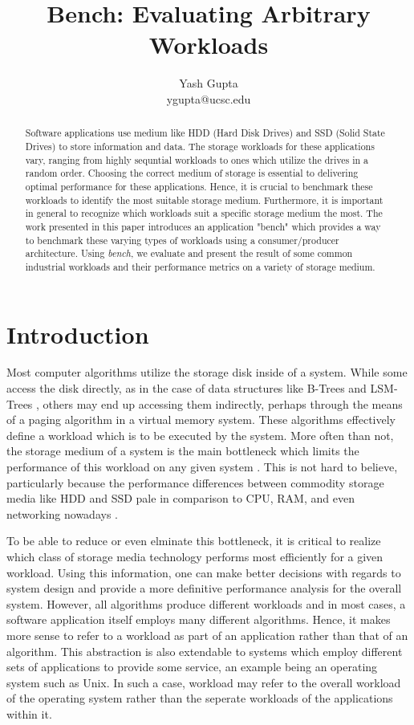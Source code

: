 \documentclass[10pt, author, twocolumn]{article}
\title{\vspace{-0ex}Bench: Evaluating Arbitrary Workloads}
\author{Yash Gupta \\
ygupta@ucsc.edu}
\date{\vspace{-3ex}}
\begin{document}
\maketitle
	
\begin{abstract}
Software applications use medium like HDD (Hard Disk Drives) and SSD (Solid State Drives) to store information and data. The storage workloads for these applications vary, ranging from highly sequntial workloads to ones which utilize the drives in a random order. Choosing the correct medium of storage is essential to delivering optimal performance for these applications. Hence, it is crucial to benchmark these workloads to identify the most suitable storage medium. Furthermore, it is important in general to recognize which workloads suit a specific storage medium the most. The work presented in this paper introduces an application "bench" which provides a way to benchmark these varying types of workloads using a consumer/producer architecture. Using \textit{bench}, we evaluate and present the result of some common industrial workloads and their performance metrics on a variety of storage medium.
\end{abstract}

\section{Introduction}
Most computer algorithms utilize the storage disk inside of a system. While some access the disk directly, as in the case of data structures like B-Trees and LSM-Trees \cite{o1996log}, others may end up accessing them indirectly, perhaps through the means of a paging algorithm in a virtual memory system. These algorithms effectively define a workload which is to be executed by the system. More often than not, the storage medium of a system is the main bottleneck which limits the performance of this workload on any given system \cite{smith1985disk}. This is not hard to believe, particularly because the performance differences between commodity storage media like HDD and SSD pale in comparison to CPU, RAM, and even networking nowadays \cite{boden1995myrinet}.

To be able to reduce or even elminate this bottleneck, it is critical to realize which class of storage media technology performs most efficiently for a given workload. Using this information, one can make better decisions with regards to system design and provide a more definitive performance analysis for the overall system. However, all algorithms produce different workloads and in most cases, a software application itself employs many different algorithms. Hence, it makes more sense to refer to a workload as part of an application rather than that of an algorithm. This abstraction is also extendable to systems which employ different sets of applications to provide some service, an example being an operating system such as Unix. In such a case, workload may refer to the overall workload of the operating system rather than the seperate workloads of the applications within it.
\end{document}
